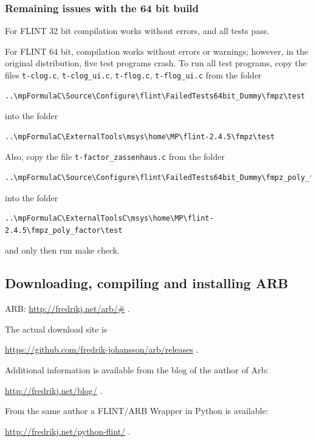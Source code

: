 \subsubsection{Remaining issues with the 64 bit build}


For FLINT 32 bit compilation works without errors, and all tests pass.

\vpara
For FLINT 64 bit, compilation works without errors or warnings; however, in the original distribution, five test programs crash. 
To run all test  programs, copy the files \verb|t-clog.c|, \verb|t-clog_ui.c|, \verb|t-flog.c|,  \verb|t-flog_ui.c| from the folder
\begin{verbatim}
..\mpFormulaC\Source\Configure\flint\FailedTests64bit_Dummy\fmpz\test
\end{verbatim}
into the folder
\begin{verbatim}
..\mpFormulaC\ExternalTools\msys\home\MP\flint-2.4.5\fmpz\test
\end{verbatim}
Also, copy the file  \verb|t-factor_zassenhaus.c| from the folder
\begin{verbatim}
..\mpFormulaC\Source\Configure\flint\FailedTests64bit_Dummy\fmpz_poly_factor\test
\end{verbatim}
into the folder
\begin{verbatim}
..\mpFormulaC\ExternalToolsC\msys\home\MP\flint-2.4.5\fmpz_poly_factor\test
\end{verbatim}

and only then run make check.



\newpage
\subsection{Downloading, compiling and installing ARB}

ARB: \href{http://fredrikj.net/arb/#}{http://fredrikj.net/arb/\#} . 

\vpara
The actual download site is

\href{https://github.com/fredrik-johansson/arb/releases}{https://github.com/fredrik-johansson/arb/releases} . 

\vpara
Additional information is available from the blog of the author of Arb:

\href{http://fredrikj.net/blog/}{http://fredrikj.net/blog/} . 


\vpara
From the same author a FLINT/ARB Wrapper in  Python is available:

\href{http://fredrikj.net/python-flint/}{http://fredrikj.net/python-flint/} . 


